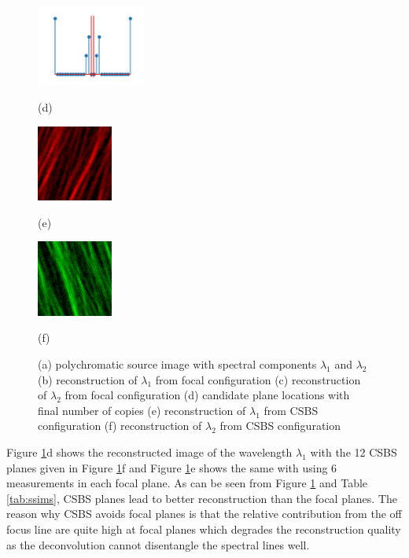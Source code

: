 \documentclass{article}
\begin{document}
\begin{figure}[t]
\begin{minipage}[b]{0.32\linewidth}
  \centering
  \centerline{\includegraphics[width=3.6cm]{planes}}
  \centerline{(d)}
\end{minipage}
\begin{minipage}[b]{0.32\linewidth}
  \centering
  \centerline{\includegraphics[width=2.5cm]{recon_csbs1}}
  \centerline{(e)}
\end{minipage}
\begin{minipage}[b]{0.32\linewidth}
  \centering
  \centerline{\includegraphics[width=2.5cm]{recon_csbs2}}
  \centerline{(f)}
\end{minipage}
\caption{(a) polychromatic source image with spectral components $\lambda_1$ and
  $\lambda_2$ (b) reconstruction of $\lambda_1$ from focal configuration (c)
  reconstruction of $\lambda_2$ from focal configuration (d) candidate plane
  locations with final number of copies (e) reconstruction of
  $\lambda_1$ from CSBS configuration (f) reconstruction of $\lambda_2$ from
  CSBS configuration}
\label{fig:results}
\end{figure}

Figure \ref{fig:results}d shows the reconstructed image of the wavelength
$\lambda_1$ with the 12 CSBS planes given in Figure \ref{fig:results}f and
Figure \ref{fig:results}e shows the same with using 6 measurements in each focal
plane. As can be seen from Figure \ref{fig:results} and Table \ref{tab:ssims},
CSBS planes lead to better reconstruction than the focal planes. The reason why
CSBS avoids focal planes is that the relative contribution from the off focus
line are quite high at focal planes which degrades the reconstruction quality
as the deconvolution cannot disentangle the spectral lines well.
\end{document}
